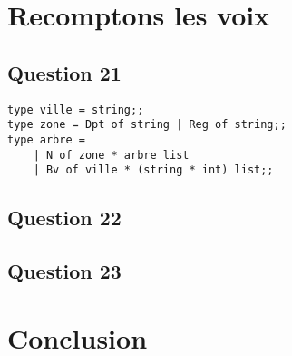 \documentclass[french, 10pt, a4paper]{article}
\begin{document}
\section{Recomptons les voix}

\subsection{Question 21}

\begin{verbatim}
type ville = string;;
type zone = Dpt of string | Reg of string;;
type arbre =
	| N of zone * arbre list
	| Bv of ville * (string * int) list;;
\end{verbatim}



\subsection{Question 22}




\subsection{Question 23}




\section{Conclusion}
\end{document}
